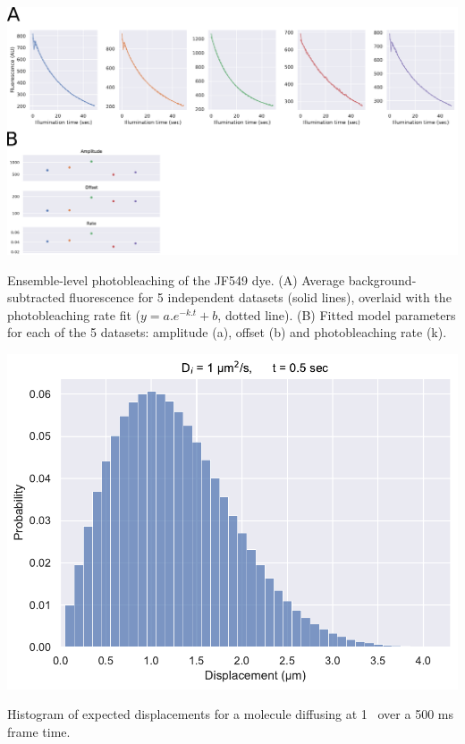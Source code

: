 \begin{suppfigure*}[htbp]
\begin{center}
\includegraphics[width=\textwidth]{SI_Figures/SIFig_bleaching.pdf}
\end{center}
\caption{Ensemble-level photobleaching of the JF549 dye. (A) Average background-subtracted fluorescence for 5 independent datasets (solid lines), overlaid with the photobleaching rate fit ($y=a.e^{-k.t}+b$, dotted line). (B) Fitted model parameters for each of the 5 datasets: amplitude (a), offset (b) and photobleaching rate (k).}
\label{SIFig:dye_bleaching}
\end{suppfigure*}

\begin{suppfigure*}[htbp]
    \begin{center}
    \includegraphics[width=.8\textwidth]{SI_Figures/Displacements_distribution.pdf}
    \end{center}
    \caption{Histogram of expected displacements for a molecule diffusing at 1 \ums\ over a 500 ms frame time.}
    \label{SIFig:displacement_simul}
\end{suppfigure*}

